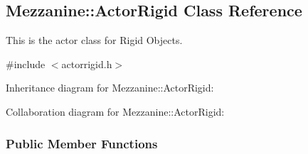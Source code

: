 \hypertarget{classMezzanine_1_1ActorRigid}{\subsection{Mezzanine\-:\-:Actor\-Rigid Class Reference}
\label{classMezzanine_1_1ActorRigid}
}


This is the actor class for Rigid Objects.  




{\ttfamily \#include $<$actorrigid.\-h$>$}



Inheritance diagram for Mezzanine\-:\-:Actor\-Rigid\-:


Collaboration diagram for Mezzanine\-:\-:Actor\-Rigid\-:
\subsubsection*{Public Member Functions}

